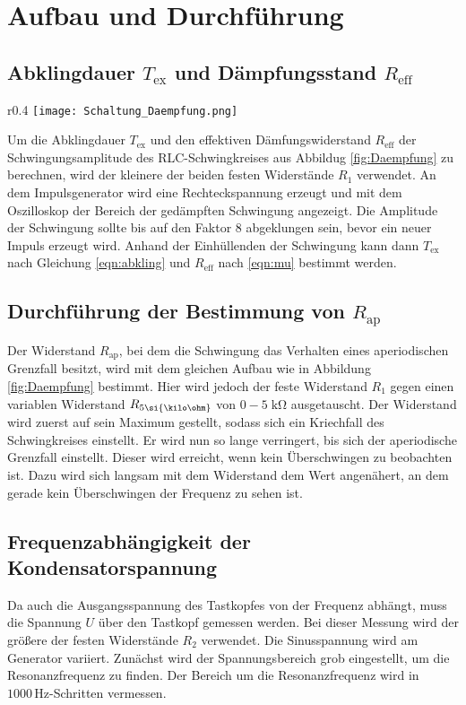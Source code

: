 \section{Aufbau und Durchführung}
\subsection{Abklingdauer $T_\text{ex}$ und Dämpfungsstand $R_\text{eff}$}
\begin{wrapfigure}{r}{0.4\textwidth}
  \centering
  \texttt{[image: Schaltung\_Daempfung.png]}
  \caption{Versuchsaufbau \cite{anleitung}.}
  \label{fig:Daempfung}
\end{wrapfigure}
Um die Abklingdauer $T_\text{ex}$ und den effektiven Dämfungswiderstand $R_\text{eff}$ der Schwingungsamplitude
des RLC-Schwingkreises aus Abbildug \ref{fig:Daempfung} zu berechnen, wird der kleinere der beiden festen Widerstände $R_\text{1}$ verwendet.
An dem Impulsgenerator wird eine Rechteckspannung erzeugt und mit dem Oszilloskop der Bereich der gedämpften Schwingung angezeigt.
Die Amplitude der Schwingung sollte bis auf den Faktor 8 abgeklungen sein, bevor ein neuer Impuls erzeugt wird.
Anhand der Einhüllenden der Schwingung kann dann $T_\text{ex}$ nach Gleichung \eqref{eqn:abkling} und $R_\text{eff}$ nach \eqref{eqn:mu}
 bestimmt werden.
\bigskip
\subsection{Durchführung der Bestimmung von $R_\text{ap}$}
Der Widerstand $R_\text{ap}$, bei dem die Schwingung das Verhalten eines aperiodischen Grenzfall besitzt, wird mit dem gleichen Aufbau
wie in Abbildung \ref{fig:Daempfung} bestimmt. Hier wird jedoch der feste Widerstand $R_\text{1}$ gegen einen variablen Widerstand
$R_\text{5\si{\kilo\ohm}}$ von $0-5 \; \si{\kilo\ohm}$ ausgetauscht.
Der Widerstand wird zuerst auf sein Maximum gestellt, sodass sich ein Kriechfall des Schwingkreises einstellt. Er wird nun so lange verringert,
bis sich der aperiodische Grenzfall einstellt. Dieser wird erreicht, wenn kein Überschwingen zu beobachten ist. Dazu wird sich langsam
mit dem Widerstand dem Wert angenähert, an dem gerade kein Überschwingen der Frequenz zu sehen ist.
\par
\subsection{Frequenzabhängigkeit der Kondensatorspannung}
Da auch die Ausgangsspannung des Tastkopfes von der Frequenz abhängt, muss die Spannung $U$ über den Tastkopf gemessen werden.
Bei dieser Messung wird der größere der festen Widerstände $R_\text{2}$ verwendet. Die Sinusspannung wird am Generator variiert.
Zunächst wird der Spannungsbereich grob eingestellt, um die Resonanzfrequenz zu finden. Der Bereich um die Resonanzfrequenz wird in
$1000\,\si{\hertz}$-Schritten vermessen.

